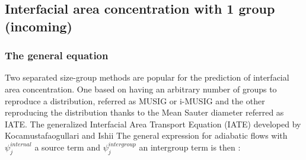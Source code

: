 \subsection{Interfacial area concentration with 1 group (incoming)}\label{Dsmu1grp}

%
\subsubsection{The general equation}
Two separated size-group methods are popular for the prediction of interfacial area concentration. One based on having an arbitrary number of groups to reproduce a distribution, referred as MUSIG or i-MUSIG \cite{Wang2005a,Das2010a,Liao2011} and the other reproducing the distribution thanks to the Mean Sauter diameter referred as IATE. The generalized Interfacial Area Transport Equation (IATE) developed by Kocamustafaogullari and Ishii \cite{Kocamustafaogullari,Kocamustafaogullari1994b}
The general expression for adiabatic flows with $\psi^{internal}_{j}$ a source term and $\psi^{intergroup}_j$ an intergroup term is then : \\

